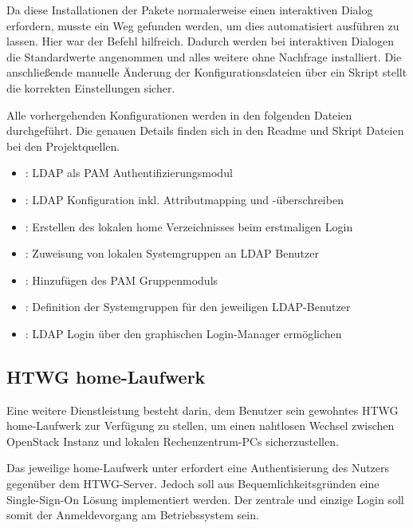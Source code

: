 Da diese Installationen der Pakete normalerweise einen interaktiven Dialog erfordern, musste ein Weg gefunden werden, um dies automatisiert ausführen zu lassen.
Hier war der Befehl  hilfreich. 
Dadurch werden bei interaktiven Dialogen die Standardwerte angenommen und alles weitere ohne Nachfrage installiert. 
Die anschließende manuelle Änderung der Konfigurationsdateien über ein Skript stellt die korrekten Einstellungen sicher.

Alle vorhergehenden Konfigurationen werden in den folgenden Dateien durchgeführt. 
Die genauen Details finden sich in den Readme und Skript Dateien bei den Projektquellen.

\begin{itemize}
\item {}: LDAP als PAM Authentifizierungsmodul
\item {}: LDAP Konfiguration inkl. Attributmapping und -überschreiben
\item {}: Erstellen des lokalen home Verzeichnisses beim erstmaligen Login
\item {}: Zuweisung von lokalen Systemgruppen an LDAP Benutzer
\item {}: Hinzufügen des PAM Gruppenmoduls
\item {}: Definition der Systemgruppen für den jeweiligen LDAP-Benutzer
\item {}: LDAP Login über den graphischen Login-Manager ermöglichen
\end{itemize}

\subsection{HTWG home-Laufwerk}

Eine weitere Dienstleistung besteht darin, dem Benutzer sein gewohntes HTWG home-Laufwerk zur Verfügung zu stellen, um einen nahtlosen Wechsel zwischen OpenStack Instanz und lokalen Rechenzentrum-PCs sicherzustellen.

Das jeweilige home-Laufwerk unter  erfordert eine Authentisierung des Nutzers gegenüber dem HTWG-Server. 
Jedoch soll aus Bequemlichkeitsgründen eine Single-Sign-On Lösung implementiert werden.
Der zentrale und einzige Login soll somit der Anmeldevorgang am Betriebssystem sein.

